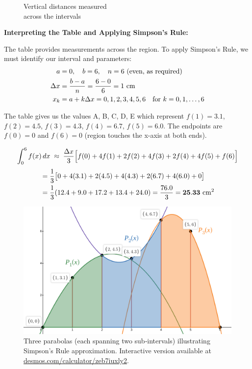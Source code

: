 \documentclass{article}
\begin{document}
\begin{figure}[h!]
\begin{minipage}[c]{0.6\textwidth}
    \vspace{-2.6cm} %
    \caption*{\small Vertical distances measured\\across the intervals}
  \end{minipage}
\end{figure}

\vspace{10pt} %

\large\textbf{Interpreting the Table and Applying Simpson's Rule:}

The table provides measurements across the region. To apply Simpson's Rule, we must identify our interval and parameters:
\begin{align}
a &= 0,\quad b = 6,\quad n = 6 \text{ (even, as required)} \notag\\
\Delta x &= \frac{b-a}{n}=\frac{6-0}{6}=1 \text{ cm} \notag\\
x_k &= a+k\Delta x = 0, 1, 2, 3, 4, 5, 6 \quad \text{for } k=0,1,\ldots,6 \notag
\end{align}

The table gives us the values A, B, C, D, E which represent $f(1)=3.1$, $f(2)=4.5$, $f(3)=4.3$, $f(4)=6.7$, $f(5)=6.0$. The endpoints are $f(0)=0$ and $f(6)=0$ (region touches the x-axis at both ends).

\vspace{5pt}
\[
\int_{0}^{6} f(x)\,dx
\;\approx\;
\frac{\Delta x}{3}
\Bigl[
    f(0)+4f(1)+2f(2)+4f(3)+2f(4)+4f(5)+f(6)
\Bigr]
\]
\vspace{5pt}
\begin{align}
&= \frac{1}{3}\bigl[0+4(3.1)+2(4.5)+4(4.3)+2(6.7)+4(6.0)+0\bigr] \notag\\
&= \frac{1}{3}(12.4 + 9.0 + 17.2 + 13.4 + 24.0) = \frac{76.0}{3} = \mathbf{25.33} \text{ cm}^2 \notag
\end{align}

\begin{figure}[h!]
  \centering
  \includegraphics[width=0.4\linewidth]{sec5-5-q4.png} %
  \caption*{\small Three parabolas (each spanning two sub‑intervals) illustrating Simpson's Rule approximation. \quad
           Interactive version available at
           \href{https://www.desmos.com/calculator/zeb7iuxly2}{desmos.com/calculator/zeb7iuxly2}.}
\end{figure}
\end{document}
